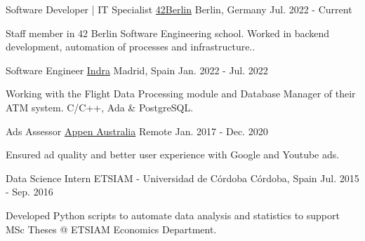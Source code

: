 

\begin{cventries}
  \cventry
    {Software Developer | IT Specialist}
    {\href{https://42berlin.de}{42Berlin}}
    {Berlin, Germany}
    {Jul. 2022 - Current}
     {
      \begin{cvitems}
        \item {Staff member in 42 Berlin Software Engineering school. Worked in backend development, automation of processes and infrastructure..}
      \end{cvitems}
    }

  \cventry
    {Software Engineer}
    {\href{https://www.indracompany.com/en/air-traffic-control-automation-system-0}{Indra}}
    {Madrid, Spain}
    {Jan. 2022 - Jul. 2022}
     {
      \begin{cvitems}
        \item {Working with the Flight Data Processing module and Database Manager of their ATM system. C/C++, Ada \& PostgreSQL.}
      \end{cvitems}
    }


  \cventry
    {Ads Assessor}
    {\href{https://appen.com/}{Appen Australia}}
    {Remote}
    {Jan. 2017 - Dec. 2020}
     {
      \begin{cvitems}
        \item {Ensured ad quality and better user experience with Google and Youtube ads.}
      \end{cvitems}
    }

  \cventry
    {Data Science Intern}
    {ETSIAM - Universidad de Córdoba}
    {Córdoba, Spain}
    {Jul. 2015 - Sep. 2016}
     {
      \begin{cvitems}
        \item {Developed Python scripts to automate data analysis and statistics to support MSc Theses @ ETSIAM Economics Department.}
      \end{cvitems}
    }


\end{cventries}
